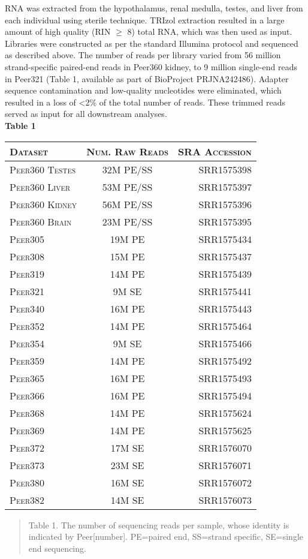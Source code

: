 \documentclass[12pt]{article}
\begin{document}
RNA was extracted from the hypothalamus, renal medulla, testes, and liver from each individual using sterile technique. TRIzol extraction resulted in a large amount of high quality (RIN $\geq$ 8) total RNA, which was then used as input. Libraries were constructed as per the standard Illumina protocol and sequenced as described above. The number of reads per library varied from 56 million strand-specific paired-end reads in Peer360 kidney, to 9 million single-end reads in Peer321 (\hypertarget{Table 1}{Table 1}, available as part of BioProject PRJNA242486). Adapter sequence contamination and low-quality nucleotides were eliminated, which resulted in a loss of \textless 2\% of the total number of reads. These trimmed reads served as input for all downstream analyses. \\
\textbf{\hypertarget{Table 1}{Table 1}} \\
\begin{center}
\begin{tabular}{l|c | r}
\textsc{Dataset}& \textsc{Num. Raw Reads} & \textsc{SRA Accession} \\
\hline 
\textsc{Peer360 Testes} & 32M PE/SS  & SRR1575398 \\
\textsc{Peer360 Liver} & 53M PE/SS & SRR1575397 \\
\textsc{Peer360 Kidney} & 56M PE/SS  & SRR1575396 \\
\textsc{Peer360 Brain}  & 23M PE/SS & SRR1575395\\
\textsc{Peer305}  & 19M PE  & SRR1575434  \\
\textsc{Peer308}  & 15M PE  & SRR1575437 \\
\textsc{Peer319}  & 14M PE  & SRR1575439\\
\textsc{Peer321}  & 9M SE  & SRR1575441 \\
\textsc{Peer340}  & 16M PE  & SRR1575443 \\
\textsc{Peer352}  & 14M PE  & SRR1575464 \\
\textsc{Peer354}  & 9M SE  & SRR1575466 \\
\textsc{Peer359}  & 14M PE  & SRR1575492 \\
\textsc{Peer365}  & 16M PE & SRR1575493 \\
\textsc{Peer366}  & 16M PE & SRR1575494 \\
\textsc{Peer368}  & 14M PE  & SRR1575624\\
\textsc{Peer369}  & 14M PE  & SRR1575625\\
\textsc{Peer372}  & 17M SE  & SRR1576070\\
\textsc{Peer373}  & 23M SE  & SRR1576071\\
\textsc{Peer380}  & 16M SE  & SRR1576072 \\
\textsc{Peer382}  & 14M SE  & SRR1576073 \\
\end{tabular}
\begin{quote}
\small{Table 1. The number of sequencing reads per sample, whose identity is indicated by Peer[number]. PE=paired end, SS=strand specific, SE=single end sequencing. }
\end{quote}
\end{center}
\end{document}
